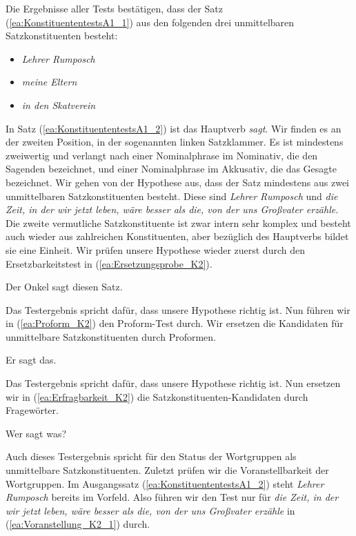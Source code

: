 Die Ergebnisse aller Tests bestätigen, dass der Satz (\ref{ea:KonstituententestsA1_1}) aus den folgenden drei unmittelbaren Satzkonstituenten besteht: 

\begin{itemize}

\item \textit{Lehrer Rumposch}

\item \textit{meine Eltern}

\item \textit{in den Skatverein}

\end{itemize}


In Satz (\ref{ea:KonstituententestsA1_2}) ist das Hauptverb \textit{sagt}. Wir finden es an der zweiten Position, in der sogenannten linken Satzklammer. Es ist mindestens zweiwertig und verlangt nach einer Nominalphrase im Nominativ, die den Sagenden bezeichnet, und einer Nominalphrase im Akkusativ, die das Gesagte bezeichnet. Wir gehen von der Hypothese aus, dass der Satz mindestens aus zwei unmittelbaren Satzkonstituenten besteht. Diese sind \textit{Lehrer Rumposch} und \textit{die Zeit, in der wir jetzt leben, wäre besser als die, von der uns Großvater erzähle}. Die zweite vermutliche Satzkonstituente ist zwar intern sehr komplex und besteht auch wieder aus zahlreichen Konstituenten, aber bezüglich des Hauptverbs bildet sie eine Einheit. Wir prüfen unsere Hypothese wieder zuerst durch den Ersetzbarkeitstest in (\ref{ea:Ersetzungsprobe_K2}).

\ea \label{ea:Ersetzungsprobe_K2} Der Onkel sagt diesen Satz.  
\z 

Das Testergebnis spricht dafür, dass unsere Hypothese richtig ist. Nun führen wir in (\ref{ea:Proform_K2}) den Proform-Test durch. Wir ersetzen die Kandidaten für unmittelbare Satzkonstituenten durch Proformen. 

\ea \label{ea:Proform_K2} Er sagt das.  
\z 

Das Testergebnis spricht dafür, dass unsere Hypothese richtig ist. Nun ersetzen wir in (\ref{ea:Erfragbarkeit_K2}) die Satzkonstituenten-Kandidaten durch Fragewörter. 

\ea \label{ea:Erfragbarkeit_K2} Wer sagt was?  
\z 

Auch dieses Testergebnis spricht für den Status der Wortgruppen als unmittelbare Satzkonstituenten. Zuletzt prüfen wir die Voranstellbarkeit der Wortgruppen. Im Ausgangssatz (\ref{ea:KonstituententestsA1_2}) steht \textit{Lehrer Rumposch} bereits im Vorfeld. Also führen wir den Test nur für \textit{die Zeit, in der wir jetzt leben, wäre besser als die, von der uns Großvater erzähle} in (\ref{ea:Voranstellung_K2_1}) durch.

